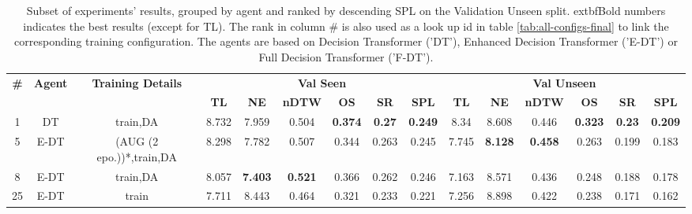 \begin{table}
\centering
\caption{\label{tab:e_dt_final}Subset of experiments' results, grouped by agent and ranked by descending SPL on the Validation Unseen split. 	extbf{Bold} numbers indicates the best results (except for TL). The rank in column \# is also used as a look up id in table \ref{tab:all-configs-final} to link the corresponding training configuration.     \newline The agents are based on Decision Transformer ('DT'), Enhanced Decision Transformer ('E-DT') or Full Decision Transformer ('F-DT').}
\begin{tabular}{@{\hskip3pt}c@{\hskip3pt}c@{\hskip3pt}c@{\hskip3pt}c@{\hskip3pt}c@{\hskip3pt}c@{\hskip3pt}c@{\hskip3pt}c@{\hskip3pt}c@{\hskip3pt}c@{\hskip3pt}c@{\hskip3pt}c@{\hskip3pt}c@{\hskip3pt}c@{\hskip3pt}c}
\toprule
\textbf{\#} & \textbf{Agent} & \textbf{Training Details} & \multicolumn{6}{c}{\textbf{Val Seen}} & \multicolumn{6}{c}{\textbf{Val Unseen}} \\
 \textbf{~} &     \textbf{~} &                \textbf{~} &       \textbf{TL} &     \textbf{NE} &   \textbf{nDTW} &     \textbf{OS} &    \textbf{SR} &    \textbf{SPL} &         \textbf{TL} &     \textbf{NE} &   \textbf{nDTW} &     \textbf{OS} &    \textbf{SR} &    \textbf{SPL} \\
\midrule
          1 &             DT &                  train,DA &             8.732 &           7.959 &           0.504 &  \textbf{0.374} &  \textbf{0.27} &  \textbf{0.249} &                8.34 &           8.608 &           0.446 &  \textbf{0.323} &  \textbf{0.23} &  \textbf{0.209} \\
          5 &           E-DT &  (AUG (2 epo.))*,train,DA &             8.298 &           7.782 &           0.507 &           0.344 &          0.263 &           0.245 &               7.745 &  \textbf{8.128} &  \textbf{0.458} &           0.263 &          0.199 &           0.183 \\
          8 &           E-DT &                  train,DA &             8.057 &  \textbf{7.403} &  \textbf{0.521} &           0.366 &          0.262 &           0.246 &               7.163 &           8.571 &           0.436 &           0.248 &          0.188 &           0.178 \\
         25 &           E-DT &                     train &             7.711 &           8.443 &           0.464 &           0.321 &          0.233 &           0.221 &               7.256 &           8.898 &           0.422 &           0.238 &          0.171 &           0.162 \\
\bottomrule
\end{tabular}
\end{table}

